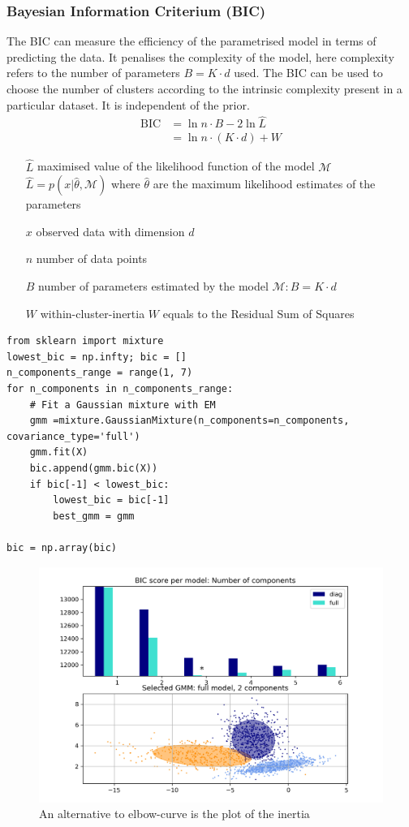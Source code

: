 \documentclass[11pt]{article}
\theoremstyle{definition}
\begin{document}
\subsubsection{Bayesian Information Criterium (BIC)}
The BIC can measure the efficiency of the parametrised model in terms of predicting the data. It penalises the complexity of the model, here complexity refers to the number of parameters $B = K\cdot d$ used. The BIC can be used to choose the number of clusters according to the intrinsic complexity present in a particular dataset. It is independent of the prior.
\begin{align*}
	\text{BIC} &= \ln{n} \cdot B - 2 \ln{\hat{L}}\\
	&= \ln{n} \cdot (K \cdot d) + W
\end{align*}
\begin{itemize}[nosep, leftmargin=*, labelindent=1.5cm, labelsep=1cm]
	\item[$\hat{L}$] maximised value of the likelihood function of the model $\mathcal{M}$\\
	$\hat{L} = p(x|\hat{\theta},\mathcal{M})$ where $\hat{\theta}$ are the maximum likelihood estimates of the parameters
	\item[$x$] observed data with dimension $d$
	\item[$n$] number of data points
	\item[$B$] number of parameters estimated by the model $\mathcal{M}: B = K\cdot d$
	\item[$W$] within-cluster-inertia $W$ equals to the Residual Sum of Squares
\end{itemize}
\begin{verbatim}
from sklearn import mixture
lowest_bic = np.infty; bic = []
n_components_range = range(1, 7)
for n_components in n_components_range:
	# Fit a Gaussian mixture with EM
	gmm =mixture.GaussianMixture(n_components=n_components, covariance_type='full')
	gmm.fit(X)
	bic.append(gmm.bic(X))
	if bic[-1] < lowest_bic:
		lowest_bic = bic[-1]
		best_gmm = gmm

bic = np.array(bic)
\end{verbatim}
\begin{figure}[H]
	\centering
	\includegraphics[width=0.8\linewidth]{img/BIC_inertia_plot}
	\caption{An alternative to elbow-curve is the plot of the inertia}
	\label{fig:bicinertiaplot}
\end{figure}
\end{document}

